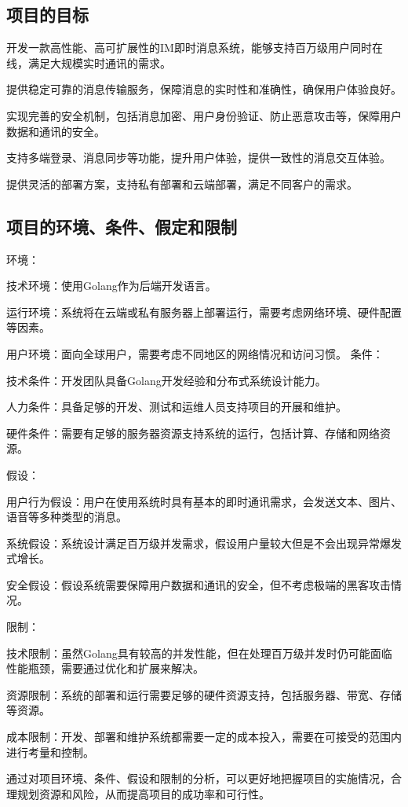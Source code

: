 \documentclass[12pt]{article}
\begin{document}
	\subsection{项目的目标}
	开发一款高性能、高可扩展性的IM即时消息系统，能够支持百万级用户同时在线，满足大规模实时通讯的需求。
	
	提供稳定可靠的消息传输服务，保障消息的实时性和准确性，确保用户体验良好。
	
	实现完善的安全机制，包括消息加密、用户身份验证、防止恶意攻击等，保障用户数据和通讯的安全。
	
	支持多端登录、消息同步等功能，提升用户体验，提供一致性的消息交互体验。
	
	提供灵活的部署方案，支持私有部署和云端部署，满足不同客户的需求。
	
	\subsection{项目的环境、条件、假定和限制}
	环境：
	
	技术环境：使用Golang作为后端开发语言。
	
	运行环境：系统将在云端或私有服务器上部署运行，需要考虑网络环境、硬件配置等因素。
	
	用户环境：面向全球用户，需要考虑不同地区的网络情况和访问习惯。
	条件：
	
	
	技术条件：开发团队具备Golang开发经验和分布式系统设计能力。
	
	人力条件：具备足够的开发、测试和运维人员支持项目的开展和维护。
	
	硬件条件：需要有足够的服务器资源支持系统的运行，包括计算、存储和网络资源。
	
	假设：
	
	用户行为假设：用户在使用系统时具有基本的即时通讯需求，会发送文本、图片、语音等多种类型的消息。
	
	系统假设：系统设计满足百万级并发需求，假设用户量较大但是不会出现异常爆发式增长。
	
	安全假设：假设系统需要保障用户数据和通讯的安全，但不考虑极端的黑客攻击情况。
	
	限制：
	
	技术限制：虽然Golang具有较高的并发性能，但在处理百万级并发时仍可能面临性能瓶颈，需要通过优化和扩展来解决。
	
	资源限制：系统的部署和运行需要足够的硬件资源支持，包括服务器、带宽、存储等资源。
	
	成本限制：开发、部署和维护系统都需要一定的成本投入，需要在可接受的范围内进行考量和控制。
	
	通过对项目环境、条件、假设和限制的分析，可以更好地把握项目的实施情况，合理规划资源和风险，从而提高项目的成功率和可行性。
	
\end{document}
